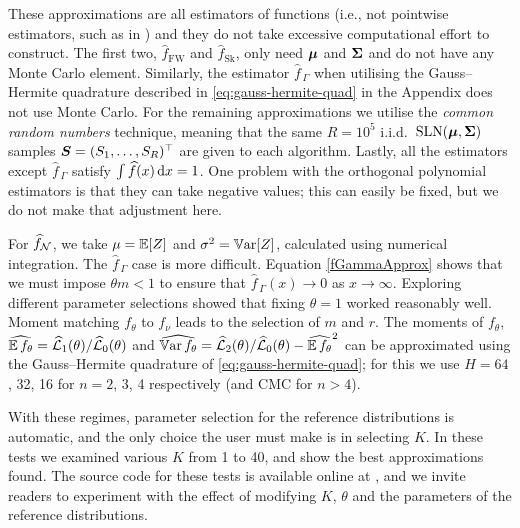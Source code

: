 These approximations are all estimators of functions (i.e., not pointwise estimators, such as in \cite{La15}) and they do not take excessive computational effort to construct. The first two, $\widehat{f}_{\mathrm{FW}}$ and $\widehat{f}_{\mathrm{Sk}}$, only need $\bm{\mu}$ and $\bm{\Sigma}$ and do not have any Monte Carlo element. Similarly, the estimator $\widehat{f}_{\,\Gamma}$ when utilising the Gauss--Hermite quadrature described in \eqref{eq:gauss-hermite-quad}
in the Appendix does not use Monte Carlo. For the remaining approximations we utilise the \emph{common random numbers} technique, meaning that the same $R=10^5$ i.i.d.\ $\mathrm{SLN}(\bm{\mu}, \bm{\Sigma})$ samples $\bm{S} = (S_1, \dots, S_R)^\top$ are given to each algorithm. Lastly, all the estimators except $\widehat{f}_{\,\Gamma}$ satisfy $\int \widehat{f}(x) \dif x = 1$. One problem with the orthogonal polynomial estimators is that they can take negative values; this can easily be fixed, but we do not make that adjustment here.



For $\widehat{f}_{\mathcal{N}}$, we take $\mu = \operatorname{{\mathbb E}}[Z]$ and $\sigma^2 = \operatorname{\mathbb{V}\mathrm{ar}}[Z]$, calculated using numerical integration.
The $\widehat{f}_{\,\Gamma}$ case is more difficult. Equation \eqref{fGammaApprox} shows that we must impose $\theta m < 1$ to ensure that $\widehat{f}_{\,\Gamma}(x)\to 0$ as $x\to \infty$.
Exploring different parameter selections showed that fixing $\theta = 1$ worked reasonably well. Moment matching $f_\theta$ to $f_\nu$ leads to the selection of $m$ and $r$. The moments of $f_\theta$,
$ \widehat{\operatorname{{\mathbb E}} f_\theta} = \widehat{\mathcal{L}}_1(\theta) / \widehat{\mathcal{L}}_0(\theta)$  and
 $\widehat{\operatorname{\mathbb{V}\mathrm{ar}} f_\theta} = \widehat{\mathcal{L}}_2(\theta) / \widehat{\mathcal{L}}_0(\theta) - \widehat{\operatorname{{\mathbb E}} f_\theta}^2  $
can be approximated using the Gauss--Hermite quadrature of \eqref{eq:gauss-hermite-quad}; for this we use $H = 64$, 32, 16 for $n=2$, 3, 4 respectively (and CMC for $n > 4$).

With these regimes, parameter selection for the reference distributions is automatic, and the only choice the user must make is in selecting $K$. In these tests we examined various $K$ from 1 to 40, and show the best approximations found.
The source code for these tests is available online at \cite{Code}, and we invite readers to experiment with the effect of modifying $K$, $\theta$ and the parameters of the reference distributions.

